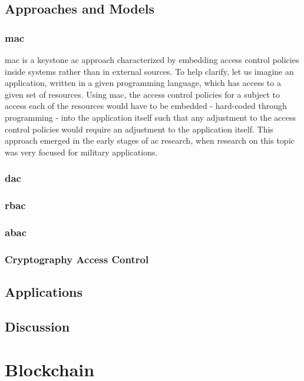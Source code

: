 \subsection{Approaches and Models}

\subsubsection{\gls{mac}}

\glsdesc{mac} is a keystone \gls{ac} approach characterized by embedding access control policies inside systems rather than in external sources. To help clarify, let us imagine an application, written in a given programming language, which has access to a given set of resources. Using \gls{mac}, the access control policies for a subject to access each of the resources would have to be embedded - hard-coded through programming - into the application itself such that any adjustment to the access control policies would require an adjustment to the application itself. This approach emerged in the early stages of \gls{ac} research, when research on this topic was very focused for military applications.

\subsubsection{\gls{dac}}

\subsubsection{\gls{rbac}}

\subsubsection{\gls{abac}}

\subsubsection{Cryptography Access Control}

\subsection{Applications}

\subsection{Discussion}

\section{Blockchain}
\label{sec:related-blockchain}

